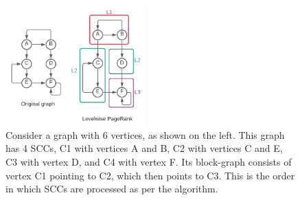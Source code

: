 \begin{figure}[!hbtp]
  \centering  %
  \includegraphics[width=0.48\textwidth]{out/about-levelwise.pdf}
  \caption{Consider a graph with 6 vertices, as shown on the left. This graph has 4 SCCs, C1 with vertices A and B, C2 with vertices C and E, C3 with vertex D, and C4 with vertex F. Its block-graph consists of vertex C1 pointing to C2, which then points to C3. This is the order in which SCCs are processed as per the \levelwisePR{} algorithm.}
  \label{fig:levelwise}
\end{figure}
